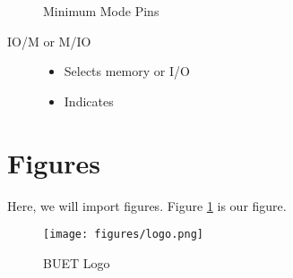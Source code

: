 \documentclass{book}
\begin{document}
\begin{description}

Minimum Mode Pins

  \item[IO/M or M/IO]
  \begin{itemize}
      \item Selects memory or I/O
      \item Indicates
  \end{itemize}


\end{description}



\section{Figures}

Here, we will import figures. Figure \ref{fig:bl} is our figure.

\begin{figure}[h!]
    \centering
    \texttt{[image: figures/logo.png]}
    \caption{BUET Logo}
    \label{fig:bl}
\end{figure}

\lipsum
\end{document}
